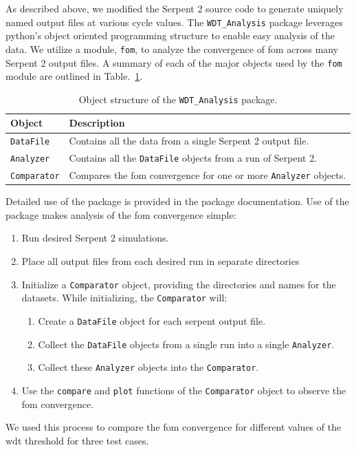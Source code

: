 As described above, we modified the Serpent 2 source code to generate
uniquely named output files at various cycle values. The
\verb|WDT_Analysis| package leverages python's object oriented
programming structure to enable easy analysis of the data. We utilize
a module, \verb|fom|, to analyze the convergence of \gls{fom} across
many Serpent 2 output files. A summary
of each of the major objects used by the \verb|fom| module are outlined in
Table.~\ref{tab:wdt_analysis}.
\begin{table}[hbtp]
  \centering
  \caption{Object structure of the \texttt{WDT\_Analysis} package.\label{tab:wdt_analysis}}
  \begin{tabular}{ll} \toprule
   \textbf{Object} & \textbf{Description} \\ \midrule
    \verb|DataFile| & Contains all the data from a single Serpent 2
                      output file. \\
    \verb|Analyzer| & Contains all the \verb|DataFile| objects
                       from a run of Serpent 2. \\
    \verb|Comparator| & Compares the \gls{fom} convergence for one or
                        more \verb|Analyzer| objects. \\
    \bottomrule
  \end{tabular}
\end{table}
Detailed use of the package is provided in the package
documentation. Use of the package makes analysis of the \gls{fom}
convergence simple:
\begin{enumerate}
\item Run desired Serpent 2 simulations.
\item Place all output files from each desired run in separate directories
\item Initialize a \verb|Comparator| object, providing the directories
  and names for the datasets. While initializing, the
  \verb|Comparator| will:
  \begin{enumerate}
  \item Create a \verb|DataFile| object for each serpent output file.
  \item Collect the \verb|DataFile| objects from a single run into a single
    \verb|Analyzer|.
  \item Collect these \verb|Analyzer| objects into the
    \verb|Comparator|.
  \end{enumerate}
\item Use the \verb|compare| and \verb|plot| functions of the
  \verb|Comparator| object to observe the \gls{fom} convergence.
\end{enumerate}
We used this process to compare the \gls{fom} convergence for
different values of the \gls{wdt} threshold for three test cases.

